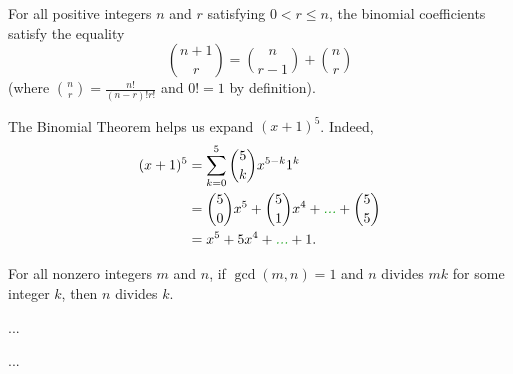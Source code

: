 \documentclass{article}
\begin{document}
\begin{lemma*}[Chapter 1, \#41] For all positive integers $n$ and $r$ satisfying $0 < r \leq n$, the binomial coefficients satisfy the equality \[
\binom{n+1}{r} = \binom{n}{r-1} + \binom{n}{r}\]
(where $\binom{n}{r} = \frac{n!}{(n-r)!r!}$ and $0! = 1$ by definition).
\end{lemma*}


\begin{example*} The Binomial Theorem helps us expand $(x+1)^5$.  Indeed, 
    \begin{align*} 
        (x+1)^5 &= \sum_{k=0}^5 \binom{5}{k} x^{5-k}1^k \\ 
                &= \binom{5}{0} x^5 + \binom{5}{1}x^4 + \todoG{...} + \binom{5}{5}\\
                &= x^5 + 5x^4 + \todoG{...} + 1.
    \end{align*}
   
\end{example*}

\clearpage



\begin{lemma*}[Ch. 1, \#39] 
    For all nonzero integers $m$ and $n$, if $\gcd(m,n) = 1$ and $n$ divides $mk$ for some integer $k$, then $n$ divides $k$.
\end{lemma*}


\begin{prop*}[Ch. 3, \#53] ...
\end{prop*}

\begin{prop*}[Ch. 3, \#56] ...
\end{prop*}
\end{document}
